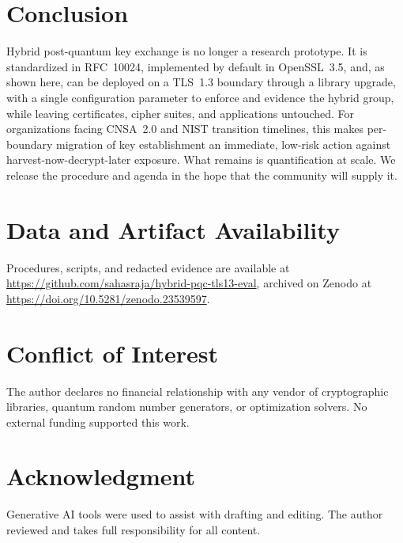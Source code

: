\documentclass[conference]{IEEEtran}
\begin{document}
\section{Conclusion}
Hybrid post-quantum key exchange is no longer a research prototype. It is standardized in RFC~10024, implemented by default in OpenSSL~3.5, and, as shown here, can be deployed on a TLS~1.3 boundary through a library upgrade, with a single configuration parameter to enforce and evidence the hybrid group, while leaving certificates, cipher suites, and applications untouched. For organizations facing CNSA~2.0 and NIST transition timelines, this makes per-boundary migration of key establishment an immediate, low-risk action against harvest-now-decrypt-later exposure. What remains is quantification at scale. We release the procedure and agenda in the hope that the community will supply it.

\section*{Data and Artifact Availability}
Procedures, scripts, and redacted evidence are available at \url{https://github.com/sahasraja/hybrid-pqc-tls13-eval}, archived on Zenodo at \url{https://doi.org/10.5281/zenodo.23539597}.

\section*{Conflict of Interest}
The author declares no financial relationship with any vendor of cryptographic libraries, quantum random number generators, or optimization solvers. No external funding supported this work.

\section*{Acknowledgment}
Generative AI tools were used to assist with drafting and editing. The author reviewed and takes full responsibility for all content.



\end{document}
